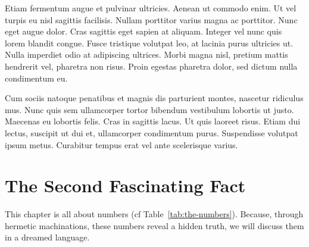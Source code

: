 \documentclass[11pt,a4paper]{memoir}\usepackage[]{graphicx}\usepackage[]{color}
\begin{document}
Etiam fermentum augue et pulvinar ultricies. Aenean ut commodo enim. Ut vel turpis eu nisl sagittis facilisis. Nullam porttitor varius magna ac porttitor. Nunc eget augue dolor. Cras sagittis eget sapien at aliquam. Integer vel nunc quis lorem blandit congue. Fusce tristique volutpat leo, at lacinia purus ultricies ut. Nulla imperdiet odio at adipiscing ultrices. Morbi magna nisl, pretium mattis hendrerit vel, pharetra non risus. Proin egestas pharetra dolor, sed dictum nulla condimentum eu.

Cum sociis natoque penatibus et magnis dis parturient montes, nascetur ridiculus mus. Nunc quis sem ullamcorper tortor bibendum vestibulum lobortis ut justo. Maecenas eu lobortis felis. Cras in sagittis lacus. Ut quis laoreet risus. Etiam dui lectus, suscipit ut dui et, ullamcorper condimentum purus. Suspendisse volutpat ipsum metus. Curabitur tempus erat vel ante scelerisque varius.



\chapter{The Second Fascinating Fact}
This chapter is all about numbers (cf Table~\ref{tab:the-numbers}). Because, through hermetic machinations, these numbers reveal a hidden truth, we will discuss them in a dreamed language.
\end{document}
